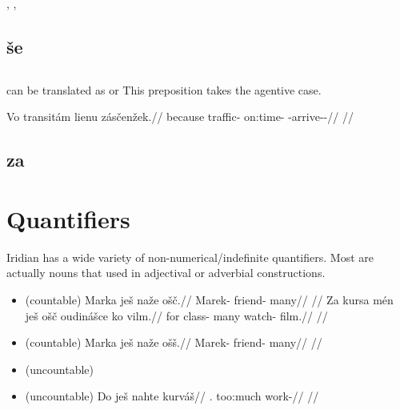 \pex
\a {}, 
\a {}, 
\xe

\subsection{še}

\subsection{}

 can be translated as  or  This preposition takes the agentive case.

\pex
\begingl
\gla Vo transitám lienu zásčenžek.//
\glb because traffic-\Agt{} on:time-\Ins{} \Neg{}-arrive-\Av{}-\Pf{}//
\glft {}//
\endgl
\xe

\subsection{za}

\section{Quantifiers}
Iridian has a wide variety of non-numerical/indefinite quantifiers.  Most are actually nouns that used in adjectival or adverbial constructions.


\begin{itemize}
    \item {}  (countable)
    \ex
    \begingl
    \gla Marka ješ naže ošč.//
    \glb Marek-\Acc{} \Exst{} friend-\Gen{} many//
    \glft {}//
    \endgl
    \xe
    \ex
    \begingl
    \gla Za kursa mén ješ ošč oudinášce ko vilm.//
    \glb for class-\Acc{}  \Exst{} many watch-\Sup{} \Att{} film.//
    \glft {}//
    \endgl
    \xe
    \item {}  (countable)
    \ex
    \begingl
    \gla Marka ješ naže ošš.//
    \glb Marek-\Acc{} \Exst{} friend-\Gen{} many//
    \glft {}//
    \endgl
    \xe
    \item {}  (uncountable)
    \item {}  (uncountable)
    \ex
    \begingl
    \gla Do ješ nahte kurváš//
    \glb \First{}\Sg{}.\Acc{} \Exst{} too:much work-\SupN{}//
    \glft {}//
    \endgl
    \xe

\end{itemize}

